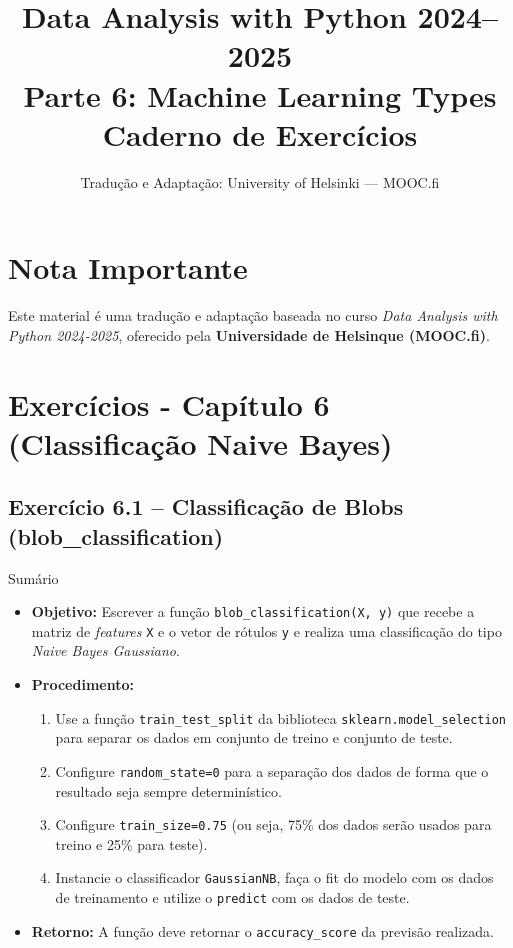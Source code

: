 \documentclass[11pt,a4paper]{article}
\title{\textbf{Data Analysis with Python 2024--2025}\\Parte 6: Machine Learning Types\\\large Caderno de Exercícios}
\author{Tradução e Adaptação: University of Helsinki --- MOOC.fi}
\date{}
\begin{document}
\maketitle

\section*{Nota Importante}
Este material é uma tradução e adaptação baseada no curso \textit{Data Analysis with Python 2024-2025}, oferecido pela \textbf{Universidade de Helsinque (MOOC.fi)}.

\tableofcontents
\newpage

\section{Exercícios - Capítulo 6 (Classificação Naive Bayes)}

\subsection*{Exercício 6.1 -- Classificação de Blobs (blob\_classification)}

\begin{exercicio}{Sumário}
\begin{itemize}
    \item \textbf{Objetivo:} Escrever a função \texttt{blob\_classification(X, y)} que recebe a matriz de \emph{features} \texttt{X} e o vetor de rótulos \texttt{y} e realiza uma classificação do tipo \emph{Naive Bayes Gaussiano}.
    \item \textbf{Procedimento:}
    \begin{enumerate}
        \item Use a função \texttt{train\_test\_split} da biblioteca \texttt{sklearn.model\_selection} para separar os dados em conjunto de treino e conjunto de teste.
        \item Configure \texttt{random\_state=0} para a separação dos dados de forma que o resultado seja sempre determinístico.
        \item Configure \texttt{train\_size=0.75} (ou seja, 75\% dos dados serão usados para treino e 25\% para teste).
        \item Instancie o classificador \texttt{GaussianNB}, faça o fit do modelo com os dados de treinamento e utilize o \texttt{predict} com os dados de teste.
    \end{enumerate}
    \item \textbf{Retorno:} A função deve retornar o \texttt{accuracy\_score} da previsão realizada.
\end{itemize}
\end{exercicio}
\end{document}
